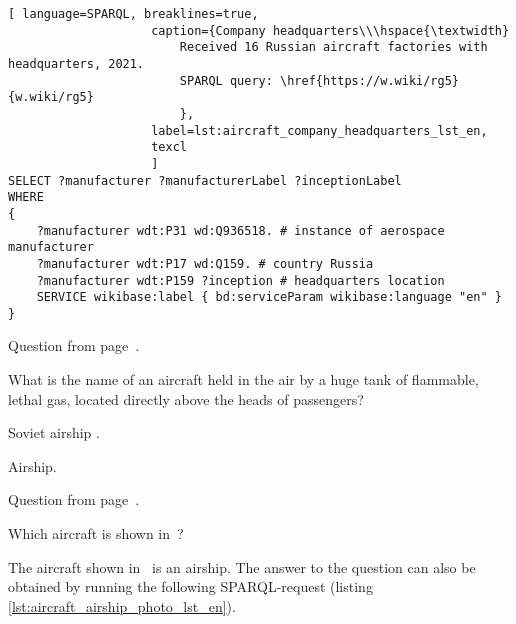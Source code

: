 \begin{lstlisting}[ language=SPARQL, breaklines=true, 
                    caption={Company headquarters\\\hspace{\textwidth}
						Received 16 Russian aircraft factories with headquarters, 2021.
                        SPARQL query: \href{https://w.wiki/rg5}{w.wiki/rg5}
                        },
                    label=lst:aircraft_company_headquarters_lst_en,
                    texcl 
                    ]
SELECT ?manufacturer ?manufacturerLabel ?inceptionLabel
WHERE
{
    ?manufacturer wdt:P31 wd:Q936518. # instance of aerospace manufacturer
  	?manufacturer wdt:P17 wd:Q159. # country Russia
  	?manufacturer wdt:P159 ?inception # headquarters location
    SERVICE wikibase:label { bd:serviceParam wikibase:language "en" }
}
\end{lstlisting}

Question from page~\pageref{question:aircraft_question_3}.


\begin{exercise}%
    \label{answer:aircraft_question_airship_en}
What is the name of an aircraft held in the air by a huge tank of flammable, lethal gas, located directly above the heads of passengers?
\end{exercise}

\begin{marginfigure}[0cm]
    {%
        \setlength{\fboxsep}{0pt}
        \setlength{\fboxrule}{1pt}
    }
    \caption[Soviet airship SSSR-V6 OSOAVIAKhIM]{Soviet airship .}
\end{marginfigure}

Airship. 

Question from page~\pageref{question:aircraft_question_4}.


\begin{exercise}%
\label{answer:aircraft_question_airship_2_en}
Which aircraft is shown in~?

\end{exercise}

The aircraft shown in~ is an airship. 
The answer to the question can also be obtained by running the following SPARQL-request (listing \ref{lst:aircraft_airship_photo_lst_en}).


